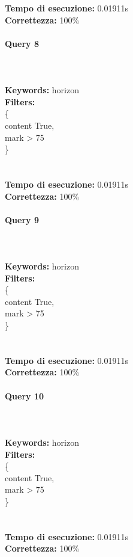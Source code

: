 \documentclass[12pt]{book}
\begin{document}
\noindent
\textbf{Tempo di esecuzione:} 0.01911s \\
\textbf{Correttezza:} 100\%

\paragraph{Query 8} ~ \\ \\

\noindent \textbf{Keywords: } horizon \\
\textbf{Filters: } \\
\indent \{ \\
\indent \indent content True, \\
\indent \indent mark > 75 \\
\indent \} \\\\\\


\noindent
\textbf{Tempo di esecuzione:} 0.01911s \\
\textbf{Correttezza:} 100\%

\paragraph{Query 9} ~ \\ \\

\noindent \textbf{Keywords: } horizon \\
\textbf{Filters: } \\
\indent \{ \\
\indent \indent content True, \\
\indent \indent mark > 75 \\
\indent \} \\\\\\


\noindent
\textbf{Tempo di esecuzione:} 0.01911s \\
\textbf{Correttezza:} 100\%

\paragraph{Query 10} ~ \\ \\

\noindent \textbf{Keywords: } horizon \\
\textbf{Filters: } \\
\indent \{ \\
\indent \indent content True, \\
\indent \indent mark > 75 \\
\indent \} \\\\\\


\noindent
\textbf{Tempo di esecuzione:} 0.01911s \\
\textbf{Correttezza:} 100\%
\end{document}
